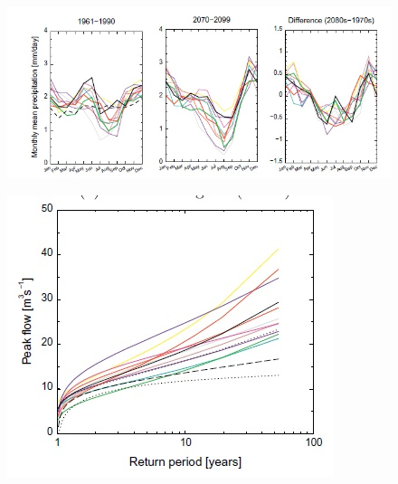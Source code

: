 \documentclass[11pt]{article}
\begin{document}
\begin{minipage}{0.59\textwidth}
    \begin{figure}[H]
    \centering
    \includegraphics[width=\textwidth]{Figs/concept_in.jpg}
    \label{fig:concept_in}
\end{figure}
\end{minipage}
\hspace{0.05\textwidth}
\begin{minipage}{0.31\textwidth}
    
\begin{figure}[H]%
    \centering
    \includegraphics[width=\textwidth]{Figs/concept_out.jpg}
    \label{fig:concept_out}
\end{figure}
\end{minipage}
\end{document}
